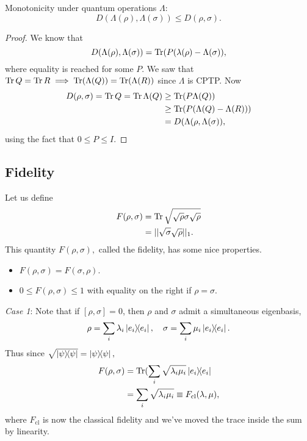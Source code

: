 \begin{lem}
    Monotonicity under quantum operations $\Lambda$:
    \begin{equation}
        D(\Lambda(\rho),\Lambda(\sigma))\leq D(\rho,\sigma).
    \end{equation}
\end{lem}
\begin{proof}
    We know that
    \begin{equation*}
        D(\Lambda(\rho),\Lambda(\sigma))=\operatorname{Tr} (P(\lambda(\rho)-\Lambda(\sigma)),
    \end{equation*}
    where equality is reached for some $P$.
    We saw that $\operatorname{Tr} Q = \operatorname{Tr} R\implies \operatorname{Tr} (\Lambda(Q)) =\operatorname{Tr} (\Lambda(R))$ since $\Lambda$ is CPTP. Now
    \begin{align*}
        D(\rho,\sigma) = \operatorname{Tr} Q = \operatorname{Tr} \Lambda(Q) &\geq \operatorname{Tr}(P \Lambda (Q))\\
        &\geq \operatorname{Tr} (P(\Lambda(Q)-\Lambda(R)))\\
        &= D(\Lambda(\rho, \Lambda(\sigma)),
    \end{align*}
    using the fact that $0\leq P \leq I.$
\end{proof}
\subsection*{Fidelity}
Let us define
\begin{align}
    F(\rho,\sigma) &= \operatorname{Tr} \sqrt{\sqrt{\rho}\sigma \sqrt{\rho}}\\
        &= ||\sqrt{\sigma}\sqrt{\rho}||_1.
\end{align}
This quantity $F(\rho,\sigma),$ called the fidelity, has some nice properties.
\begin{itemize}
    \item $F(\rho,\sigma)=F(\sigma,\rho)$.
    \item $0\leq F(\rho,\sigma)\leq 1$ with equality on the right if $\rho=\sigma$.
\end{itemize}
\textit{Case 1}: Note that if $[\rho,\sigma]=0$, then $\rho$ and $\sigma$ admit a simultaneous eigenbasis,
\begin{equation*}
    \rho=\sum_i \lambda_i \left\lvert{e_i}\middle\rangle\!\middle\langle{e_i}\right\rvert,\quad \sigma=\sum_i \mu_i \left\lvert{e_i}\middle\rangle\!\middle\langle{e_i}\right\rvert.
\end{equation*}
Thus since $\sqrt{\left\lvert{\psi}\middle\rangle\!\middle\langle{\psi}\right\rvert}=\left\lvert{\psi}\middle\rangle\!\middle\langle{\psi}\right\rvert,$
\begin{align}
    F(\rho,\sigma)&=\operatorname{Tr} (\sum_i \sqrt{\lambda_i \mu_i} \left\lvert{e_i}\middle\rangle\!\middle\langle{e_i}\right\rvert\\
    &=\sum_i \sqrt{\lambda_i \mu_i} \equiv F_{\text{cl}}(\lambda,\mu),
\end{align}
where $F_{\text{cl}}$ is now the classical fidelity and we've moved the trace inside the sum by linearity.

